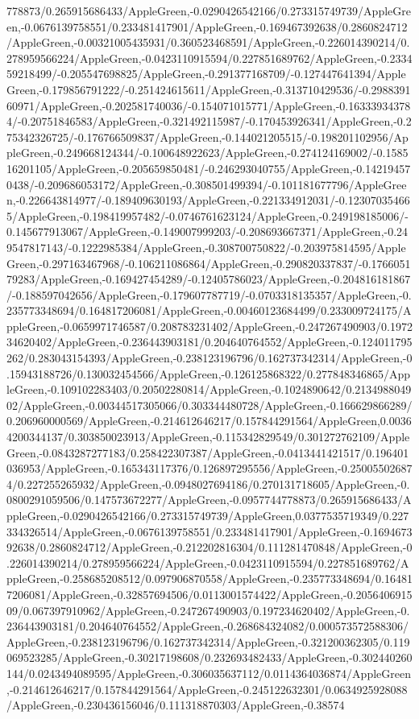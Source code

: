 {\begin{tikzternal}
{778873/0.265915686433/AppleGreen,-0.0290426542166/0.273315749739/AppleGreen,-0.0676139758551/0.233481417901/AppleGreen,-0.169467392638/0.2860824712/AppleGreen,-0.00321005435931/0.360523468591/AppleGreen,-0.226014390214/0.278959566224/AppleGreen,-0.0423110915594/0.227851689762/AppleGreen,-0.233459218499/-0.205547698825/AppleGreen,-0.291377168709/-0.127447641394/AppleGreen,-0.179856791222/-0.251424615611/AppleGreen,-0.313710429536/-0.298839160971/AppleGreen,-0.202581740036/-0.154071015771/AppleGreen,-0.163339343784/-0.20751846583/AppleGreen,-0.321492115987/-0.170453926341/AppleGreen,-0.275342326725/-0.176766509837/AppleGreen,-0.144021205515/-0.198201102956/AppleGreen,-0.249668124344/-0.100648922623/AppleGreen,-0.274124169002/-0.158516201105/AppleGreen,-0.205659850481/-0.246293040755/AppleGreen,-0.142194570438/-0.209686053172/AppleGreen,-0.308501499394/-0.101181677796/AppleGreen,-0.226643814977/-0.189409630193/AppleGreen,-0.221334912031/-0.123070354665/AppleGreen,-0.198419957482/-0.0746761623124/AppleGreen,-0.249198185006/-0.145677913067/AppleGreen,-0.149007999203/-0.208693667371/AppleGreen,-0.249547817143/-0.1222985384/AppleGreen,-0.308700750822/-0.203975814595/AppleGreen,-0.297163467968/-0.106211086864/AppleGreen,-0.290820337837/-0.176605179283/AppleGreen,-0.169427454289/-0.12405786023/AppleGreen,-0.204816181867/-0.188597042656/AppleGreen,-0.179607787719/-0.0703318135357/AppleGreen,-0.235773348694/0.164817206081/AppleGreen,-0.00460123684499/0.233009724175/AppleGreen,-0.0659971746587/0.208783231402/AppleGreen,-0.247267490903/0.197234620402/AppleGreen,-0.236443903181/0.204640764552/AppleGreen,-0.124011795262/0.283043154393/AppleGreen,-0.238123196796/0.162737342314/AppleGreen,-0.15943188726/0.130032454566/AppleGreen,-0.126125868322/0.277848346865/AppleGreen,-0.109102283403/0.20502280814/AppleGreen,-0.1024890642/0.213498804902/AppleGreen,-0.00344517305066/0.303344480728/AppleGreen,-0.166629866289/0.206960000569/AppleGreen,-0.214612646217/0.157844291564/AppleGreen,0.00364200344137/0.303850023913/AppleGreen,-0.115342829549/0.301272762109/AppleGreen,-0.0843287277183/0.258422307387/AppleGreen,-0.0413441421517/0.196401036953/AppleGreen,-0.165343117376/0.126897295556/AppleGreen,-0.250055026874/0.227255265932/AppleGreen,-0.0948027694186/0.270131718605/AppleGreen,-0.0800291059506/0.147573672277/AppleGreen,-0.0957744778873/0.265915686433/AppleGreen,-0.0290426542166/0.273315749739/AppleGreen,0.0377535719349/0.227334326514/AppleGreen,-0.0676139758551/0.233481417901/AppleGreen,-0.169467392638/0.2860824712/AppleGreen,-0.212202816304/0.111281470848/AppleGreen,-0.226014390214/0.278959566224/AppleGreen,-0.0423110915594/0.227851689762/AppleGreen,-0.258685208512/0.097906870558/AppleGreen,-0.235773348694/0.164817206081/AppleGreen,-0.32857694506/0.0113001574422/AppleGreen,-0.205640691509/0.067397910962/AppleGreen,-0.247267490903/0.197234620402/AppleGreen,-0.236443903181/0.204640764552/AppleGreen,-0.268684324082/0.000573572588306/AppleGreen,-0.238123196796/0.162737342314/AppleGreen,-0.321200362305/0.119069523285/AppleGreen,-0.30217198608/0.232693482433/AppleGreen,-0.302440260144/0.0243494089595/AppleGreen,-0.306035637112/0.0114364036874/AppleGreen,-0.214612646217/0.157844291564/AppleGreen,-0.245122632301/0.0634925928088/AppleGreen,-0.230436156046/0.111318870303/AppleGreen,-0.38574}
\end{tikzternal}}

